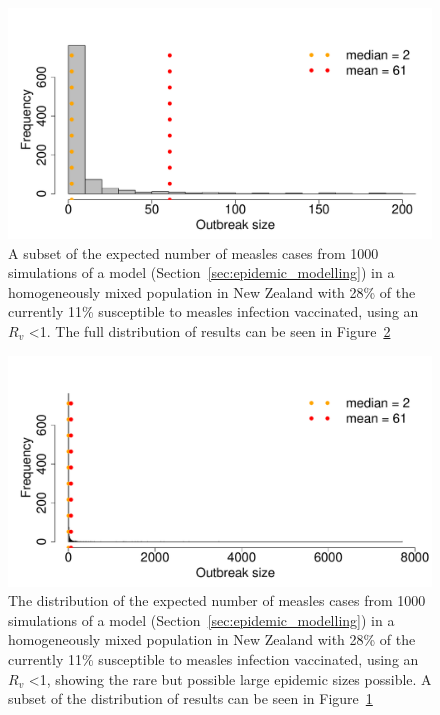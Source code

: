 \documentclass{article}
\begin{document}
\begin{itemize}
\begin{figure}
     \centering
\includegraphics{draftfinalreport-063}
     \caption{A subset of the expected number of measles cases from 1000 simulations of a model (Section~\ref{sec:epidemic_modelling}) in a homogeneously mixed population in New Zealand with 28\% of the currently 11\% susceptible to measles infection vaccinated, using an $R_v$ <1. The full distribution of results can be seen in Figure~\ref{fig:sim1}}
     \label{fig:sim}
\end{figure}

\begin{figure}
     \centering
\includegraphics{draftfinalreport-064}
     \caption{The distribution of the expected number of measles cases from 1000 simulations of a model (Section~\ref{sec:epidemic_modelling}) in a homogeneously mixed population in New Zealand with 28\% of the currently 11\% susceptible to measles infection vaccinated, using an $R_v$ <1, showing the rare but possible large epidemic sizes possible. A subset of the distribution of results can be seen in Figure~\ref{fig:sim}}
     \label{fig:sim1}
\end{figure}




\end{itemize}
\end{document}
